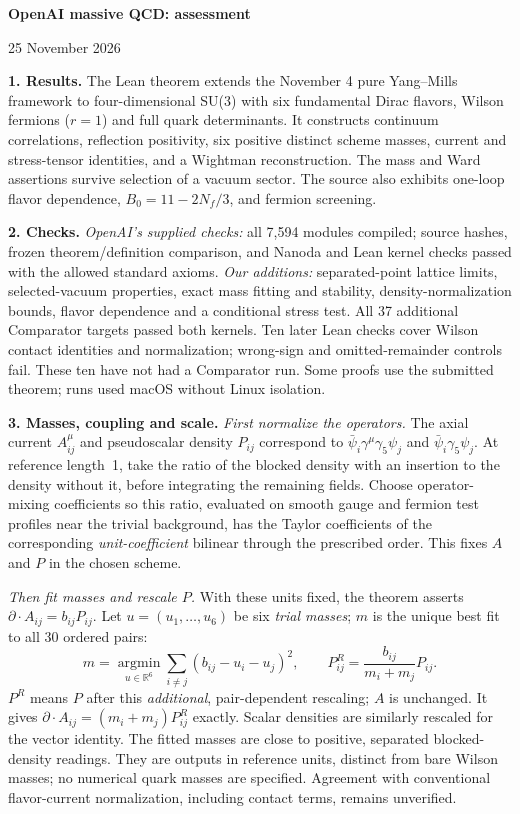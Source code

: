 \documentclass[11pt]{article}
\begin{document}
\begin{center}
{\Large\bfseries OpenAI massive QCD: assessment}\par
\vspace{3pt}
25 November 2026
\end{center}
\vspace{-4pt}

\textbf{1. Results.}
The Lean theorem extends the November 4 pure Yang--Mills framework to
four-dimensional SU(3) with six fundamental Dirac flavors, Wilson fermions
($r=1$) and full quark determinants. It constructs continuum correlations,
reflection positivity, six positive distinct scheme masses, current and
stress-tensor identities, and a Wightman reconstruction. The mass and Ward
assertions survive selection of a vacuum sector. The source also exhibits
one-loop flavor dependence, $B_0=11-2N_f/3$, and fermion screening.

\textbf{2. Checks.}
\textit{OpenAI's supplied checks:} all 7,594 modules compiled; source hashes,
frozen theorem/definition comparison, and Nanoda and Lean kernel checks
passed with the allowed standard axioms.
\textit{Our additions:} separated-point lattice limits, selected-vacuum
properties, exact mass fitting and stability, density-normalization bounds,
flavor dependence and a conditional stress test. All 37 additional Comparator
targets passed both kernels. Ten later Lean checks cover Wilson contact
identities and normalization; wrong-sign and omitted-remainder controls fail.
These ten have not had a Comparator run. Some proofs use the submitted theorem;
runs used macOS without Linux isolation.

\textbf{3. Masses, coupling and scale.}
\textit{First normalize the operators.} The axial current $A^\mu_{ij}$ and
pseudoscalar density $P_{ij}$ correspond to
$\bar\psi_i\gamma^\mu\gamma_5\psi_j$ and $\bar\psi_i\gamma_5\psi_j$.
At reference length~1, take the ratio of the blocked density with an insertion
to the density without it, before integrating the remaining fields.
Choose operator-mixing coefficients so this ratio, evaluated on smooth gauge
and fermion test profiles near the trivial background, has the Taylor
coefficients of the corresponding \emph{unit-coefficient} bilinear through
the prescribed order. This fixes $A$ and $P$ in the chosen scheme.

\textit{Then fit masses and rescale $P$.} With these units fixed, the theorem
asserts $\partial\!\cdot A_{ij}=b_{ij}P_{ij}$. Let $u=(u_1,\ldots,u_6)$
be six \emph{trial masses}; $m$ is the unique best fit to all 30 ordered pairs:
\[
 m=\underset{u\in\mathbb R^6}{\operatorname{argmin}}
       \sum_{i\ne j}(b_{ij}-u_i-u_j)^2,
 \qquad P^R_{ij}=\frac{b_{ij}}{m_i+m_j}P_{ij}.
\]
$P^R$ means $P$ after this \emph{additional}, pair-dependent rescaling;
$A$ is unchanged. It gives $\partial\!\cdot A_{ij}=(m_i+m_j)P^R_{ij}$ exactly.
Scalar densities are similarly rescaled for the vector identity.
The fitted masses are close to positive, separated blocked-density readings.
They are outputs in reference units, distinct from bare Wilson masses;
no numerical quark masses are specified. Agreement with conventional
flavor-current normalization, including contact terms, remains unverified.
\end{document}
